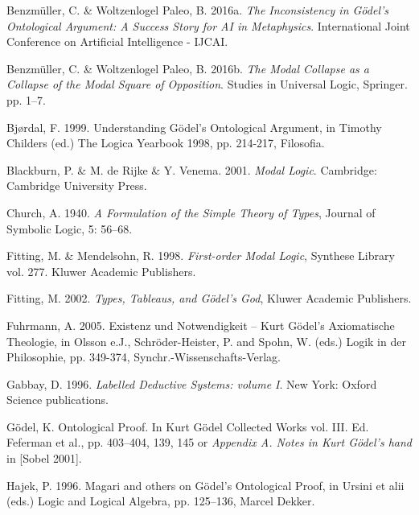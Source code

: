 \documentclass[smallextended]{svjour3}
\begin{document}
\begin{thebibliography}{9}
Benzm\"uller, C. \& Woltzenlogel Paleo, B. 2016a. {\itshape The Inconsistency in G\"odel's Ontological Argument: A Success Story for AI in Metaphysics}. International Joint Conference on Artificial Intelligence - IJCAI. 

Benzm\"uller, C. \& Woltzenlogel Paleo, B. 2016b. {\itshape The Modal Collapse as a Collapse of the Modal Square of Opposition}. Studies in Universal Logic, Springer. pp. 1--7. 

Bj{\o}rdal, F. 1999. Understanding G\"odel's Ontological Argument, in Timothy Childers (ed.) The Logica Yearbook 1998, pp. 214-217, Filosofia.

Blackburn, P. \&  M. de Rijke \& Y. Venema. 2001. {\itshape Modal Logic}. Cambridge: Cambridge University Press.

Church, A. 1940. {\itshape A Formulation of the Simple Theory of Types}, Journal of Symbolic Logic, 5: 56--68. 

Fitting, M. \& Mendelsohn, R. 1998.  {\itshape First-order Modal Logic}, Synthese Library vol. 277. Kluwer Academic Publishers.  

Fitting, M. 2002.  {\itshape Types, Tableaus, and G\"odel's God}, Kluwer Academic Publishers.  

Fuhrmann, A. 2005.
Existenz und Notwendigkeit -- Kurt G\"odel's Axiomatische Theologie, in Olsson e.J., Schr\"oder-Heister, P. and Spohn, W. (eds.) Logik in der Philosophie, pp. 349-374, Synchr.-Wissenschafts-Verlag.

Gabbay, D. 1996. {\itshape Labelled Deductive Systems: volume I}. New York: Oxford Science publications. 

G\"odel, K. Ontological Proof. In Kurt G\"odel Collected Works vol. III. Ed. Feferman et al., pp. 403--404, 139, 145 or {\itshape Appendix A. Notes in Kurt G\"odel's hand} in [Sobel 2001]. 

Hajek, P. 1996. Magari and others on G\"odel's Ontological Proof, in Ursini et alii
(eds.) Logic and Logical Algebra, pp. 125--136, Marcel Dekker.


\end{thebibliography}
\end{document}
